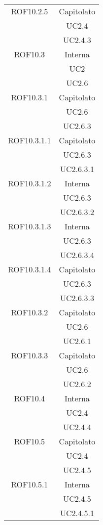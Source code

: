 \begin{longtable}{|c|c|}
\midrule
ROF10.2.5
& Capitolato\\
& UC2.4\\
& UC2.4.3\\

\midrule
ROF10.3
& Interna\\
& UC2\\
& UC2.6\\

\midrule
ROF10.3.1
& Capitolato\\
& UC2.6\\
& UC2.6.3\\

\midrule
ROF10.3.1.1
& Capitolato\\
& UC2.6.3\\
& UC2.6.3.1\\

\midrule
ROF10.3.1.2
& Interna\\
& UC2.6.3\\
& UC2.6.3.2\\

\midrule
ROF10.3.1.3
& Interna\\
& UC2.6.3\\
& UC2.6.3.4\\

\midrule
ROF10.3.1.4
& Capitolato\\
& UC2.6.3\\
& UC2.6.3.3\\

\midrule
ROF10.3.2
& Capitolato\\
& UC2.6\\
& UC2.6.1\\

\midrule
ROF10.3.3
& Capitolato\\
& UC2.6\\
& UC2.6.2\\

\midrule
ROF10.4
& Interna\\
& UC2.4\\
& UC2.4.4\\

\midrule
ROF10.5
& Capitolato\\
& UC2.4\\
& UC2.4.5\\

\midrule
ROF10.5.1
& Interna\\
& UC2.4.5\\
& UC2.4.5.1\\


\end{longtable}
